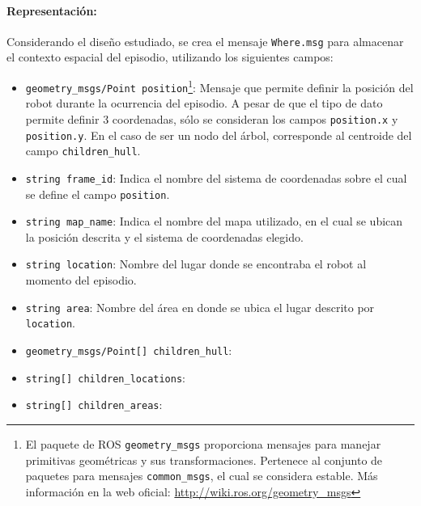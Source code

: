 \paragraph{Representación:}
Considerando el diseño estudiado, se crea el mensaje \texttt{Where.msg} para almacenar el contexto espacial del episodio, utilizando los siguientes campos:
\begin{itemize}
	\item \texttt{geometry\_msgs/Point position}\footnote{El paquete de ROS \texttt{geometry\_msgs} proporciona mensajes para manejar primitivas geométricas y sus transformaciones. Pertenece al conjunto de paquetes para mensajes \texttt{common\_msgs}, el cual se considera estable. Más información en la web oficial: \url{http://wiki.ros.org/geometry\_msgs}}: Mensaje que permite definir la posición del robot durante la ocurrencia del episodio. A pesar de que el tipo de dato permite definir 3 coordenadas, sólo se consideran los campos \texttt{position.x} y \texttt{position.y}. En el caso de ser un nodo del árbol, corresponde al centroide del campo \texttt{children\_hull}.
	\item \texttt{string frame\_id}: Indica el nombre del sistema de coordenadas sobre el cual se define el campo \texttt{position}.
	\item \texttt{string map\_name}: Indica el nombre del mapa utilizado, en el cual se ubican la posición descrita y el sistema de coordenadas elegido. 
	\item \texttt{string location}: Nombre del lugar donde se encontraba el robot al momento del episodio.
	\item \texttt{string area}: Nombre del área en donde se ubica el lugar descrito por \texttt{location}. 
	\item \texttt{geometry\_msgs/Point[] children\_hull}:
	\item \texttt{string[] children\_locations}:
	\item \texttt{string[] children\_areas}:
\end{itemize}

